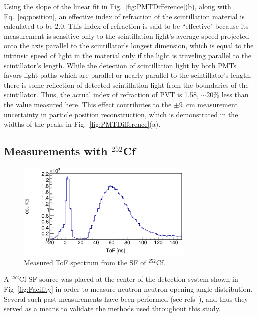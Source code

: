 Using the slope of the linear fit in Fig.~\ref{fig:PMTDifference}(b), along with Eq.~\ref{eq:position}, an effective index of refraction of the scintillation material is calculated to be 2.0.
This index of refraction is said to be ``effective" because its measurement is sensitive only to the scintillation light's average speed projected onto the axis parallel to the scintillator's longest dimension, which is equal to the intrinsic speed of light in the material only if the light is traveling parallel to the scintillator's length.
While the detection of scintillation light by both PMTs favors light paths which are parallel or nearly-parallel to the scintillator's length, there is some reflection of detected scintillation light from the boundaries of the scintillator.
Thus, the actual index of refraction of PVT is 1.58, $\sim{20}\%$ less than the value measured here.
This effect contributes to the $\pm9$~cm measurement uncertainty in particle position reconstruction, which is demonstrated in the widths of the peaks in Fig.~\ref{fig:PMTDifference}(a).

\subsection{Measurements with $^{252}$Cf}
\begin{figure}[h]
\includegraphics[width=0.75\textwidth]{Content/Methods/Cf252ToF.png}
\caption{Measured ToF spectrum from the SF of $^{252}$Cf.}
\label{fig:Cf252ToF}
\end{figure}
A $^{252}$Cf SF source was placed at the center of the detection system shown in Fig~\ref{fig:Facility} in order to measure neutron-neutron opening angle distribution.
Several such past measurements have been performed (see refs~\cite{1975Cf252, Pozzi2014, 2008CF252, Verbeke2018}), and thus they served as a means to validate the methods used throughout this study.

